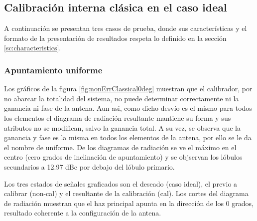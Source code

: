 \subsection{Calibración interna clásica en el caso ideal}

A continuación se presentan tres casos de prueba, donde sus características y el formato de la presentación de resultados respeta
lo definido en la sección \ref{sc:characteristics}.


\subsubsection{Apuntamiento uniforme}

Los gráficos de la figura \ref{fig:nonErrClassical0deg} muestran que el calibrador, por no abarcar la totalidad del sistema, no 
puede determinar correctamente ni la ganancia ni fase de la antena. Aun asi, como dicho desvío es el mismo para todos los
elementos el diagrama de radiación resultante mantiene su forma y sus atributos no se modifican, salvo la ganancia total. A su
vez, se observa que la ganancia y fase es la misma en todos los elementos de la antena, por ello se le da el nombre de uniforme.
De los diagramas de radiación se ve el máximo en el centro (cero grados de inclinación de apuntamiento) y se objservan los
lóbulos secundarios a 12.97 dBc por debajo del lóbulo primario.

Los tres estados de señales graficados son el deseado (caso ideal), el previo a calibrar (non-cal) y el resultante de la
calibración (cal). Los cortes del diagrama de radiación muestran que el haz principal apunta en la dirección de los 0 grados,
resultado coherente a la configuración de la antena.

